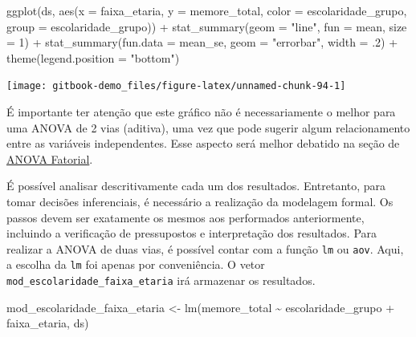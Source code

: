 \documentclass[
]{book}
\newenvironment{Shaded}{\begin{snugshade}}{\end{snugshade}}
\newcommand{\AttributeTok}[1]{\textcolor[rgb]{0.77,0.63,0.00}{#1}}
\newcommand{\DecValTok}[1]{\textcolor[rgb]{0.00,0.00,0.81}{#1}}
\newcommand{\FunctionTok}[1]{\textcolor[rgb]{0.00,0.00,0.00}{#1}}
\newcommand{\NormalTok}[1]{#1}
\newcommand{\OtherTok}[1]{\textcolor[rgb]{0.56,0.35,0.01}{#1}}
\newcommand{\SpecialCharTok}[1]{\textcolor[rgb]{0.00,0.00,0.00}{#1}}
\newcommand{\StringTok}[1]{\textcolor[rgb]{0.31,0.60,0.02}{#1}}
\begin{document}
\begin{Shaded}
\begin{Highlighting}[]
\FunctionTok{ggplot}\NormalTok{(ds, }\FunctionTok{aes}\NormalTok{(}\AttributeTok{x =}\NormalTok{ faixa\_etaria, }\AttributeTok{y =}\NormalTok{ memore\_total, }
               \AttributeTok{color =}\NormalTok{ escolaridade\_grupo, }
               \AttributeTok{group  =}\NormalTok{ escolaridade\_grupo)) }\SpecialCharTok{+}
  \FunctionTok{stat\_summary}\NormalTok{(}\AttributeTok{geom =} \StringTok{"line"}\NormalTok{, }\AttributeTok{fun =}\NormalTok{ mean, }\AttributeTok{size =} \DecValTok{1}\NormalTok{) }\SpecialCharTok{+}
  \FunctionTok{stat\_summary}\NormalTok{(}\AttributeTok{fun.data =}\NormalTok{ mean\_se, }
               \AttributeTok{geom =} \StringTok{"errorbar"}\NormalTok{, }\AttributeTok{width =}\NormalTok{ .}\DecValTok{2}\NormalTok{) }\SpecialCharTok{+}
  \FunctionTok{theme}\NormalTok{(}\AttributeTok{legend.position =} \StringTok{"bottom"}\NormalTok{)}
\end{Highlighting}
\end{Shaded}

\begin{center}\texttt{[image: gitbook-demo\_files/figure-latex/unnamed-chunk-94-1]} \end{center}

É importante ter atenção que este gráfico não é necessariamente o melhor para uma ANOVA de 2 vias (aditiva), uma vez que pode sugerir algum relacionamento entre as variáveis independentes. Esse aspecto será melhor debatido na seção de \protect\hyperlink{anova_fatorial}{ANOVA Fatorial}.

É possível analisar descritivamente cada um dos resultados. Entretanto, para tomar decisões inferenciais, é necessário a realização da modelagem formal. Os passos devem ser exatamente os mesmos aos performados anteriormente, incluindo a verificação de pressupostos e interpretação dos resultados. Para realizar a ANOVA de duas vias, é possível contar com a função \texttt{lm} ou \texttt{aov}. Aqui, a escolha da \texttt{lm} foi apenas por conveniência. O vetor \texttt{mod\_escolaridade\_faixa\_etaria} irá armazenar os resultados.

\begin{Shaded}
\begin{Highlighting}[]
\NormalTok{mod\_escolaridade\_faixa\_etaria }\OtherTok{\textless{}{-}} \FunctionTok{lm}\NormalTok{(memore\_total }\SpecialCharTok{\textasciitilde{}}\NormalTok{ escolaridade\_grupo }\SpecialCharTok{+}\NormalTok{ faixa\_etaria, ds)}
\end{Highlighting}
\end{Shaded}
\end{document}
